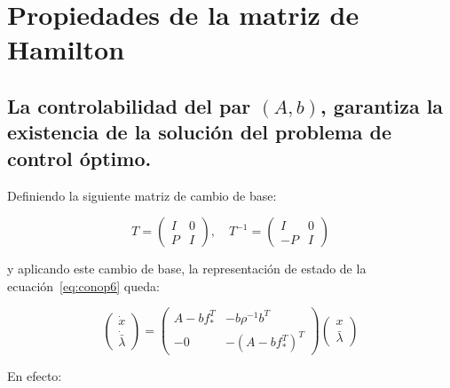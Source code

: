     \section{Propiedades de la matriz de Hamilton}

        \subsection{La controlabilidad del par $(A, b)$, garantiza la existencia de la solución del problema de control óptimo.}

            Definiendo la siguiente matriz de cambio de base:

            \begin{equation}
                T =
                \begin{pmatrix}
                    I & 0 \\
                    P & I
                \end{pmatrix}, \quad T^{-1} =
                \begin{pmatrix}
                    I & 0 \\
                    -P & I
                \end{pmatrix}
            \end{equation}

            y aplicando este cambio de base, la representación de estado de la ecuación~\ref{eq:conop6} queda:

            \begin{equation} \label{eq:conop10}
                \begin{pmatrix}
                    \dot{x} \\
                    \dot{\bar{\lambda}}
                \end{pmatrix} =
                \begin{pmatrix}
                    A - b f_*^T & -b \rho^{-1} b^T \\
                    -0 & - (A - b f_*^T)^T
                \end{pmatrix}
                \begin{pmatrix}
                    x \\
                    \bar{\lambda}
                \end{pmatrix}
            \end{equation}

            En efecto:

